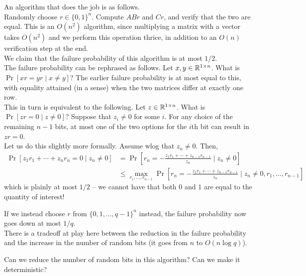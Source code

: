 		An algorithm that does the job is as follows.\\ %
		Randomly choose $r \in \{0,1\}^n$. Compute $ABr$ and $Cr$, and verify that the two are equal. This is an $O(n^2)$ algorithm, since multiplying a matrix with a vector takes $O(n^2)$ and we perform this operation thrice, in addition to an $O(n)$ verification step at the end.\\

		We claim that the failure probability of this algorithm is at most $1/2$.\\
		The failure probability can be rephrased as follows. Let $x,y \in \mathbb{R}^{1 \times n}$. What is $\Pr[xr = yr \mid x \ne y]$? The earlier failure probability is at most equal to this, with equality attained (in a sense) when the two matrices differ at exactly one row. \\
		This in turn is equivalent to the following. Let $z \in \mathbb{R}^{1 \times n}$. What is $\Pr[zr = 0 \mid z \ne 0]$? Suppose that $z_i \ne 0$ for some $i$. For any choice of the remaining $n-1$ bits, at most one of the two options for the $i$th bit can result in $zr = 0$.\\
		Let us do this slightly more formally. Assume wlog that $z_n \ne 0$. Then,
		\begin{align*}
			\Pr\left[z_1r_1 + \cdots + z_nr_n = 0 \mid z_n \ne 0\right] &= \Pr\left[r_n = -\frac{z_1r_1 + \cdots + z_{n-1}r_{n-1}}{z_n} \mid z_n \ne 0\right] \\
				&\le \max_{r_1,\ldots,r_{n-1}} \Pr\left[ r_n = -\frac{z_1r_1 + \cdots + z_{n-1}r_{n-1}}{z_n} \mid z_n \ne 0, r_1,\ldots,r_{n-1} \right]
		\end{align*}
		which is plainly at most $1/2$ -- we cannot have that both $0$ and $1$ are equal to the quantity of interest!

		\begin{remark}
			If we instead choose $r$ from $\{0,1,\ldots,q-1\}^n$ instead, the failure probability now goes down at most $1/q$.\\
			There is a tradeoff at play here between the reduction in the failure probability and the increase in the number of random bits (it goes from $n$ to $O(n \log q)$).
		\end{remark}

		\begin{question*}
			Can we reduce the number of random bits in this algorithm? Can we make it deterministic?
		\end{question*}

